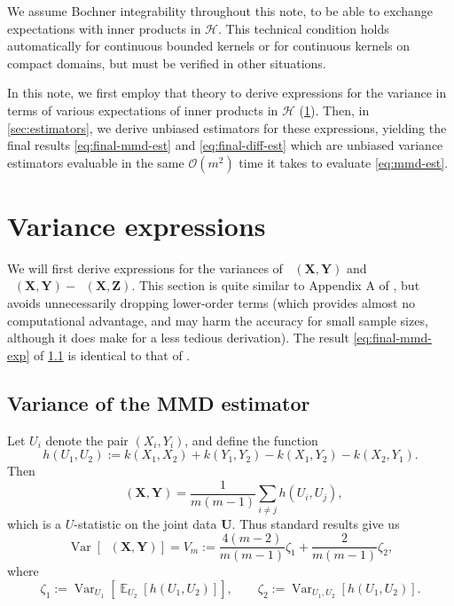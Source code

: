 \documentclass{article}
\DeclareMathOperator{\E}{\mathbb{E}}
\DeclareMathOperator{\Var}{Var}
\DeclareMathOperator{\mmdsqu}{\widehat{MMD}_U^2}
\newcommand{\h}{\mathcal{H}}
\newcommand{\setX}{\mathbf{X}}
\newcommand{\setY}{\mathbf{Y}}
\newcommand{\setZ}{\mathbf{Z}}
\newcommand{\setU}{\mathbf{U}}
\begin{document}
We assume Bochner integrability throughout this note,
to be able to exchange expectations with inner products in $\h$.
This technical condition holds automatically for continuous bounded kernels
or for continuous kernels on compact domains,
but must be verified in other situations.

In this note, we first employ that theory to derive expressions for the variance in terms of various expectations of inner products in $\h$ (\cref{sec:var-expressions}).
Then, in \cref{sec:estimators}, we derive unbiased estimators for these expressions,
yielding the final results \eqref{eq:final-mmd-est} and \eqref{eq:final-diff-est}
which are unbiased variance estimators evaluable in the same $\mathcal{O}(m^2)$ time
it takes to evaluate \eqref{eq:mmd-est}.


\section{Variance expressions} \label{sec:var-expressions}

We will first derive expressions for the variances of
$\mmdsqu(\setX, \setY)$
and $\mmdsqu(\setX, \setY) - \mmdsqu(\setX, \setZ)$.
This section is quite similar to Appendix A of \textcite{three-sample},
but avoids unnecessarily dropping lower-order terms
(which provides almost no computational advantage, and may harm the accuracy for small sample sizes, although it does make for a less tedious derivation).
The result \eqref{eq:final-mmd-exp} of \cref{sec:mmd-expression} is identical to that of \textcite{opt-mmd}.


\subsection{Variance of the MMD estimator} \label{sec:mmd-expression}

Let $U_i$ denote the pair $(X_i, Y_i)$,
and define the function
\[
    h(U_1, U_2) := k(X_1, X_2) + k(Y_1, Y_2) - k(X_1, Y_2) - k(X_2, Y_1)
.\]
Then \[
\mmdsqu(\setX, \setY) = \frac{1}{m (m-1)} \sum_{i \ne j} h(U_i, U_j)
,\]
which is a $U$-statistic on the joint data $\setU$.
Thus standard results \parencite[Section 5.2.1, Lemma A]{serfling}
give us
\[
    \Var\left[ \mmdsqu(\setX, \setY) \right]
    = V_m
    := \frac{4 (m-2)}{m (m-1)} \zeta_1 + \frac{2}{m (m-1)} \zeta_2
,\] where
\[
    \zeta_1 := \Var_{U_1}\left[ \E_{U_2}\left[ h(U_1, U_2) \right] \right],
    \qquad
    \zeta_2 := \Var_{U_1, U_2}\left[ h(U_1, U_2) \right]
.\]
\end{document}
